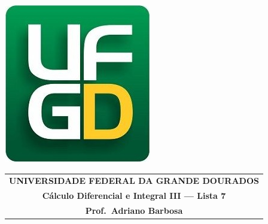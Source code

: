 \documentclass[a4paper,5pt]{amsbook}
\begin{document}
\thispagestyle{empty}
\pagestyle{empty}
\begin{minipage}[h]{0.14\textwidth}
	\includegraphics[scale=0.24]{../../ufgd.png}
\end{minipage}
\begin{minipage}[h]{\textwidth}
\begin{tabular}{c}
{{\bf UNIVERSIDADE FEDERAL DA GRANDE DOURADOS}}\\
{{\bf C\'alculo Diferencial e Integral III --- Lista 7}}\\
{{\bf Prof.\ Adriano Barbosa}}\\
\end{tabular}
\vspace{-0.45cm}
%
\end{minipage}

\end{document}
